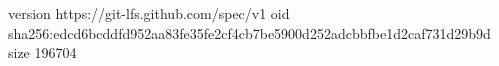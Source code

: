 version https://git-lfs.github.com/spec/v1
oid sha256:edcd6bcddfd952aa83fe35fe2cf4cb7be5900d252adcbbfbe1d2caf731d29b9d
size 196704
